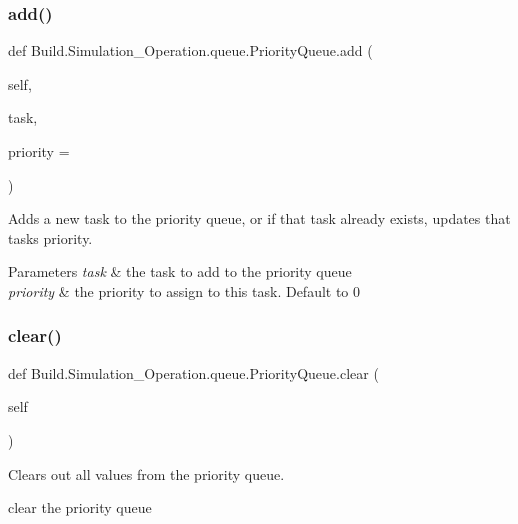 \subsubsection{\texorpdfstring{add()}{add()}}
{\footnotesize\ttfamily def Build.\+Simulation\+\_\+\+Operation.\+queue.\+Priority\+Queue.\+add (\begin{DoxyParamCaption}\item[{}]{self,  }\item[{}]{task,  }\item[{}]{priority = {} }\end{DoxyParamCaption})}



Adds a new task to the priority queue, or if that task already exists, updates that tasks priority. 


\begin{DoxyParams}{Parameters}
{\em task} & the task to add to the priority queue \\
\hline
{\em priority} & the priority to assign to this task. Default to 0 \\
\hline
\end{DoxyParams}
\mbox{\label{class_build_1_1_simulation___operation_1_1queue_1_1_priority_queue_aeac0d1993374ae61b482b14cfe824473}} 
\subsubsection{\texorpdfstring{clear()}{clear()}}
{\footnotesize\ttfamily def Build.\+Simulation\+\_\+\+Operation.\+queue.\+Priority\+Queue.\+clear (\begin{DoxyParamCaption}\item[{}]{self }\end{DoxyParamCaption})}



Clears out all values from the priority queue. 

\begin{DoxyVerb}clear the priority queue\end{DoxyVerb}
 \mbox{\label{class_build_1_1_simulation___operation_1_1queue_1_1_priority_queue_a62ca97541bd2863177111afa2ebf01f0}} 
